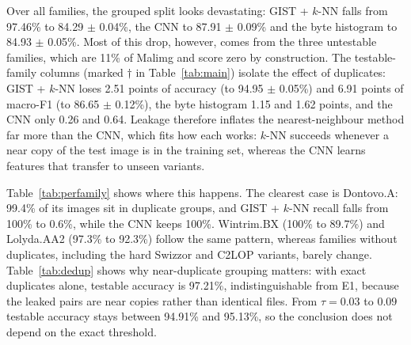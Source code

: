 \documentclass[conference]{IEEEtran}
\begin{document}
Over all families, the grouped split looks devastating:
GIST + $k$-NN falls from 97.46\% to 84.29 $\pm$ 0.04\%, the CNN to 87.91 $\pm$ 0.09\% and
the byte histogram to 84.93 $\pm$ 0.05\%. Most of this drop, however, comes from the three
untestable families, which are 11\% of Malimg and score zero by construction. The
testable-family columns (marked $\dagger$ in Table~\ref{tab:main}) isolate the
effect of duplicates:
GIST + $k$-NN loses 2.51 points of accuracy (to 94.95 $\pm$ 0.05\%) and
6.91 points of macro-F1 (to 86.65 $\pm$ 0.12\%), the byte histogram
1.15 and 1.62 points, and the CNN only 0.26 and 0.64.
Leakage therefore inflates the nearest-neighbour method far more than the CNN, which
fits how each works: $k$-NN succeeds whenever a near copy of the test image is in the
training set, whereas the CNN learns features that transfer to unseen variants.

Table~\ref{tab:perfamily} shows where this happens.
The clearest case is Dontovo.A: 99.4\% of its images sit in duplicate groups,
and GIST + $k$-NN recall falls from 100\% to 0.6\%, while the CNN keeps
100\%. Wintrim.BX (100\% to 89.7\%) and Lolyda.AA2
(97.3\% to 92.3\%) follow the same pattern, whereas families without
duplicates, including the hard Swizzor and C2LOP variants, barely change.
Table~\ref{tab:dedup} shows why near-duplicate grouping matters: with exact duplicates
alone, testable accuracy is 97.21\%, indistinguishable from E1, because the
leaked pairs are near copies rather than identical files. From $\tau = 0.03$ to $0.09$
testable accuracy stays between 94.91\% and 95.13\%, so the
conclusion does not depend on the exact threshold.
\end{document}
